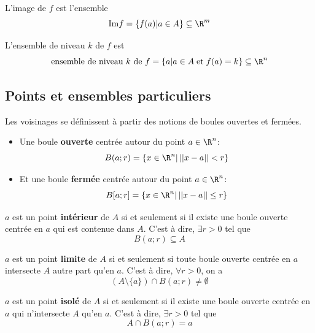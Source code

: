 \begin{mydef} [Image de $f$] L'image de $f$ est l'ensemble
	\[ \mathrm{Im} f = \{ f(a) | a \in A\} \subseteq \R^m \]
\end{mydef}

\begin{mydef} 
	L'ensemble de niveau $k$ de $f$ est
	\[ \text{ensemble de niveau } k\text{ de }f = \{ a | a \in A \;\text{et}\; f(a) = k \} \subseteq \R^n \]
\end{mydef}


\subsection{Points et ensembles particuliers}

\begin{mydef} [Boules] Les voisinages se définissent à partir des notions de boules ouvertes et fermées.
	\begin{itemize}
		\item Une boule \textbf{ouverte} centrée autour du point $a \in \R^n$:
			\[ B(a;r) = \{ x \in \R^n |\,||x-a|| < r \} \]
		\item Et une boule \textbf{fermée} centrée autour du point $a \in \R^n$:
			\[ B[a;r] = \{ x \in \R^n |\,||x-a|| \leq r \} \]
	\end{itemize}
\end{mydef}

\begin{mydef}
	$a$ est un point \textbf{intérieur} de $A$ si et seulement si il existe une boule ouverte centrée en $a$ qui est contenue dans $A$.
	C'est à dire, $\exists r > 0$ tel que
	\[ B(a; r) \subseteq A \]
\end{mydef}

\begin{mydef} 
	$a$ est un point \textbf{limite} de $A$ si et seulement si toute boule ouverte centrée en $a$ intersecte $A$ autre part qu'en $a$.
	C'est à dire, $\forall r > 0$, on a
	\[ (A \setminus \{a\}) \cap B(a; r) \neq \emptyset \]
\end{mydef}

\begin{mydef} 
	$a$ est un point \textbf{isolé} de $A$ si et seulement si il existe une boule ouverte centrée en $a$ qui n'intersecte $A$ qu'en $a$.
	C'est à dire, $\exists r > 0$ tel que
	\[ A \cap B(a; r) = a \]
\end{mydef}

